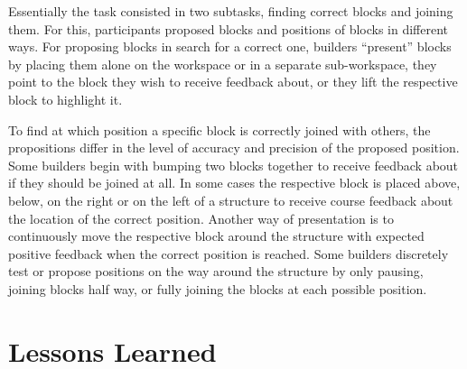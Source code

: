 Essentially the task consisted in two subtasks, finding correct blocks and joining them. For this, participants proposed blocks and positions of blocks in different ways. For proposing blocks in search for a correct one, builders ``present'' blocks by placing them alone on the workspace or in a separate sub-workspace, they point to the block they wish to receive feedback about, or they lift the respective block to highlight it.


To find at which position a specific block is correctly joined with others, the propositions differ in the level of accuracy and precision of the proposed position. Some builders begin with bumping two blocks together to receive feedback about if they should be joined at all. In some cases the respective block is placed above, below, on the right or on the left of a structure to receive course feedback about the location of the correct position. Another way of presentation is to continuously move the respective block around the structure with expected positive feedback when the correct position is reached. Some builders discretely test or propose positions on the way around the structure by only pausing, joining blocks half way, or fully joining the blocks at each possible position.


\section{Lessons Learned}


